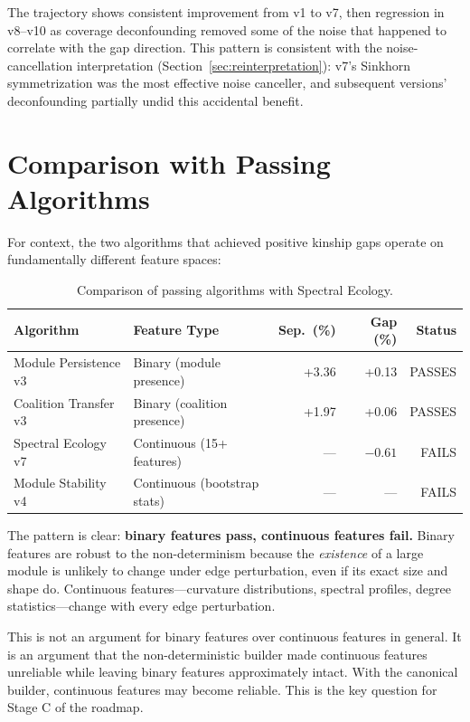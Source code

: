 \documentclass{../yalumba}
\begin{document}
\noindent
The trajectory shows consistent improvement from v1 to v7, then regression in
v8--v10 as coverage deconfounding removed some of the noise that happened to
correlate with the gap direction. This pattern is consistent with the
noise-cancellation interpretation (Section~\ref{sec:reinterpretation}): v7's
Sinkhorn symmetrization was the most effective noise canceller, and subsequent
versions' deconfounding partially undid this accidental benefit.


\section{Comparison with Passing Algorithms}
\label{app:passing}

For context, the two algorithms that achieved positive kinship gaps operate on
fundamentally different feature spaces:

\begin{table}[H]
\centering
\caption{Comparison of passing algorithms with Spectral Ecology.}
\label{tab:passing-comparison}
\begin{tabular}{llrrr}
\toprule
\rowcolor{table-header}
\textbf{Algorithm} & \textbf{Feature Type} & \textbf{Sep.\ (\%)} & \textbf{Gap (\%)} & \textbf{Status} \\
\midrule
Module Persistence v3  & Binary (module presence) & +3.36 & +0.13 & PASSES \\
Coalition Transfer v3  & Binary (coalition presence) & +1.97 & +0.06 & PASSES \\
Spectral Ecology v7    & Continuous (15+ features) & --- & $-0.61$ & FAILS \\
Module Stability v4    & Continuous (bootstrap stats) & --- & --- & FAILS \\
\bottomrule
\end{tabular}
\end{table}

\noindent
The pattern is clear: \textbf{binary features pass, continuous features fail.}
Binary features are robust to the non-determinism because the \textit{existence}
of a large module is unlikely to change under edge perturbation, even if its
exact size and shape do. Continuous features---curvature distributions, spectral
profiles, degree statistics---change with every edge perturbation.

This is not an argument for binary features over continuous features in general.
It is an argument that the non-deterministic builder made continuous features
unreliable while leaving binary features approximately intact. With the
canonical builder, continuous features may become reliable. This is the key
question for Stage C of the roadmap.
\end{document}
